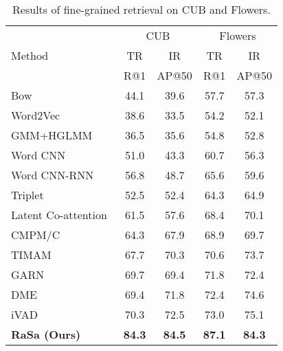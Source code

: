 \documentclass{article}
\begin{document}
\begin{table}
\small
\renewcommand\arraystretch{1.2}
\setlength{\tabcolsep}{1.5pt}
\centering
\begin{tabular}{l|cc|cc} 
\hline
\multirow{3}{*}{Method} & \multicolumn{2}{c|}{CUB}      & \multicolumn{2}{c}{Flowers}    \\
                                                    & TR            & IR            & TR            & IR  \\
                                                    & R@1           & AP@50         & R@1           & AP@50          \\ 
\hline
Bow~\cite{harris1954distributional}                 & 44.1          & 39.6          & 57.7          & 57.3           \\
Word2Vec~\cite{mikolov2013distributed}              & 38.6          & 33.5          & 54.2          & 52.1           \\
GMM+HGLMM~\cite{klein2015associating}               & 36.5          & 35.6          & 54.8          & 52.8           \\
Word CNN~\cite{reed2016learning}                    & 51.0          & 43.3          & 60.7          & 56.3           \\
Word CNN-RNN~\cite{reed2016learning}                & 56.8          & 48.7          & 65.6          & 59.6           \\
Triplet~\cite{li2017identity}                       & 52.5          & 52.4          & 64.3          & 64.9           \\
Latent Co-attention~\cite{li2017identity}           & 61.5          & 57.6          & 68.4          & 70.1           \\
CMPM/C~\cite{zhang2018deep}                         & 64.3          & 67.9          & 68.9          & 69.7           \\
TIMAM~\cite{sarafianos2019adversarial}              & 67.7          & 70.3          & 70.6          & 73.7           \\
GARN~\cite{jing2021learning}                        & 69.7          & 69.4          & 71.8          & 72.4           \\
DME~\cite{wang2021divide}                           & 69.4          & 71.8          & 72.4          & 74.6           \\
iVAD~\cite{wang2022improving}                       & 70.3          & 72.5          & 73.0          & 75.1           \\
\hline
\textbf{RaSa (Ours)}                         & \textbf{84.3}       & \textbf{84.5}     & \textbf{87.1}      & \textbf{84.3}               \\
\hline
\end{tabular}
\caption{Results of fine-grained retrieval on CUB and Flowers.}
\label{table6}
\end{table}
\end{document}

